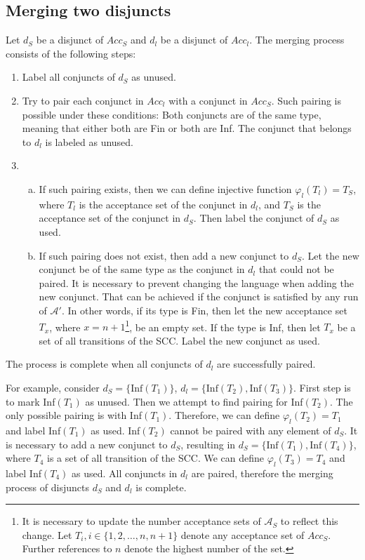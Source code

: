 \documentclass[
  digital, %
  twoside, %
  table,   %
  lof,     %
  lot,     %
]{fithesis3}
\begin{document}
\subsection{Merging two disjuncts}
Let $d_S$ be a disjunct of $Acc_S$ and $d_l$ be a disjunct of $Acc_l$. The merging process consists of the following steps:
\begin{enumerate}
  \item Label all conjuncts of $d_S$ as unused.
  \item Try to pair each conjunct in $Acc_l$ with a conjunct in $Acc_S$. Such pairing is possible under these conditions: Both conjuncts are of the same type, meaning that either both are Fin or both are Inf. The conjunct that belongs to $d_l$ is labeled as unused.
  \item \begin{enumerate}[a)]
    \item If such pairing exists, then we can define injective function $\varphi_l (T_l) = T_S$, where $T_l$ is the acceptance set of the conjunct in $d_l$, and $T_S$ is the acceptance set of the conjunct in $d_S$. Then label the conjunct of $d_S$ as used.
    \item If such pairing does not exist, then add a new conjunct to $d_S$. Let the new conjunct be of the same type as the conjunct in $d_l$ that could not be paired. It is necessary to prevent changing the language when adding the new conjunct. That can be achieved if the conjunct is satisfied by any run of $\mathcal{A'}$. In other words, if its type is Fin, then let the new acceptance set $T_x$, where $x = n + 1$\footnote{It is necessary to update the number acceptance sets of $\mathcal{A}_S$ to reflect this change. Let $T_i, i \in \{1,2, \dots, n, n+1\}$ denote any acceptance set of $Acc_S$. Further references to $n$ denote the highest number of the set.}, be an empty set. If the type is Inf, then let $T_x$ be a set of all transitions of the SCC. Label the new conjunct as used.
  \end{enumerate}
\end{enumerate}
The process is complete when all conjuncts of $d_l$ are successfully paired.

For example, consider $d_S = \{\text{Inf}(T_1)\}$, $d_l = \{\text{Inf}(T_2), \text{Inf}(T_3)\}$. First step is to mark Inf$(T_1)$ as unused. Then we attempt to find pairing for Inf$(T_2)$. The only possible pairing is with Inf$(T_1)$. Therefore, we can define $\varphi_l(T_2) = T_1$ and label Inf$(T_1)$ as used. Inf$(T_2)$ cannot be paired with any element of $d_S$. It is necessary to add a new conjunct to $d_S$, resulting in $d_S = \{\text{Inf}(T_1), \text{Inf}(T_4)\}$, where $T_{4}$ is a set of all transition of the SCC. We can define $\varphi_l(T_3) = T_4$ and label Inf$(T_4)$ as used. All conjuncts in $d_l$ are paired, therefore the merging process of disjuncts $d_S$ and $d_l$ is complete.
\end{document}
